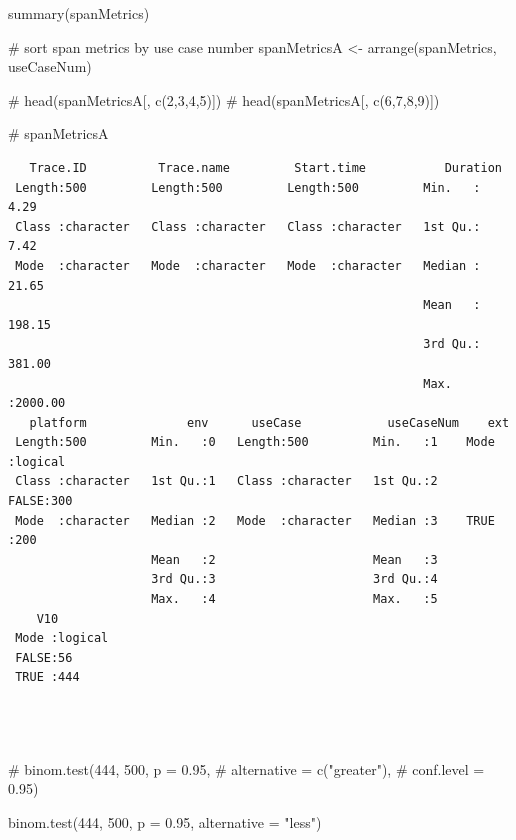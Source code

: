 \documentclass[
  letterpaper,
  DIV=11,
  numbers=noendperiod]{scrartcl}
\newenvironment{Shaded}{\begin{snugshade}}{\end{snugshade}}
\newcommand{\AttributeTok}[1]{\textcolor[rgb]{0.40,0.45,0.13}{#1}}
\newcommand{\CommentTok}[1]{\textcolor[rgb]{0.37,0.37,0.37}{#1}}
\newcommand{\DecValTok}[1]{\textcolor[rgb]{0.68,0.00,0.00}{#1}}
\newcommand{\FloatTok}[1]{\textcolor[rgb]{0.68,0.00,0.00}{#1}}
\newcommand{\FunctionTok}[1]{\textcolor[rgb]{0.28,0.35,0.67}{#1}}
\newcommand{\NormalTok}[1]{\textcolor[rgb]{0.00,0.23,0.31}{#1}}
\newcommand{\OtherTok}[1]{\textcolor[rgb]{0.00,0.23,0.31}{#1}}
\newcommand{\StringTok}[1]{\textcolor[rgb]{0.13,0.47,0.30}{#1}}
\begin{document}
\begin{Shaded}
\begin{Highlighting}[]
\FunctionTok{summary}\NormalTok{(spanMetrics)}

\CommentTok{\# sort span metrics by use case number}
\NormalTok{spanMetricsA }\OtherTok{\textless{}{-}} \FunctionTok{arrange}\NormalTok{(spanMetrics, useCaseNum)}

\CommentTok{\# head(spanMetricsA[, c(2,3,4,5)])}
\CommentTok{\# head(spanMetricsA[, c(6,7,8,9)])}

\CommentTok{\# spanMetricsA}
\end{Highlighting}
\end{Shaded}

\begin{verbatim}
   Trace.ID          Trace.name         Start.time           Duration      
 Length:500         Length:500         Length:500         Min.   :   4.29  
 Class :character   Class :character   Class :character   1st Qu.:   7.42  
 Mode  :character   Mode  :character   Mode  :character   Median :  21.65  
                                                          Mean   : 198.15  
                                                          3rd Qu.: 381.00  
                                                          Max.   :2000.00  
   platform              env      useCase            useCaseNum    ext         
 Length:500         Min.   :0   Length:500         Min.   :1    Mode :logical  
 Class :character   1st Qu.:1   Class :character   1st Qu.:2    FALSE:300      
 Mode  :character   Median :2   Mode  :character   Median :3    TRUE :200      
                    Mean   :2                      Mean   :3                   
                    3rd Qu.:3                      3rd Qu.:4                   
                    Max.   :4                      Max.   :5                   
    V10         
 Mode :logical  
 FALSE:56       
 TRUE :444      
                
                
                
\end{verbatim}

\begin{Shaded}
\begin{Highlighting}[]
\CommentTok{\# binom.test(444, 500, p = 0.95,}
\CommentTok{\#            alternative = c("greater"),}
\CommentTok{\#            conf.level = 0.95)}

\FunctionTok{binom.test}\NormalTok{(}\DecValTok{444}\NormalTok{, }\DecValTok{500}\NormalTok{, }\AttributeTok{p =} \FloatTok{0.95}\NormalTok{, }\AttributeTok{alternative =} \StringTok{"less"}\NormalTok{)}
\end{Highlighting}
\end{Shaded}
\end{document}
